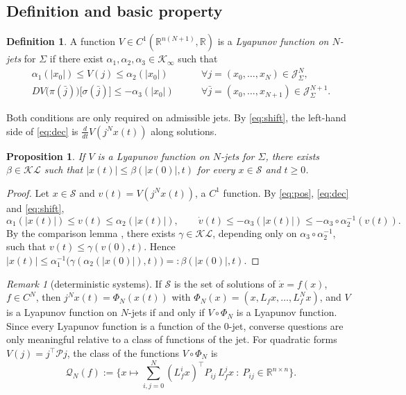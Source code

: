 \documentclass[preprint,12pt,authoryear]{elsarticle}
\newtheorem{proposition}[theorem]{Proposition}
\theoremstyle{definition}
\newtheorem{definition}[theorem]{Definition}
\theoremstyle{remark}
\newtheorem{remark}[theorem]{Remark}
\newcommand{\R}{\mathbb{R}}
\newcommand{\Jet}{\mathcal{J}}
\newcommand{\tr}{^{\top}}
\newcommand{\PP}{\mathcal{P}}
\newcommand{\Sol}{\mathcal{S}}
\begin{document}
\subsection{Definition and basic property}
\begin{definition}\label{def:jetLF}
A function $V\in C^1(\R^{n(N+1)},\R)$ is a \emph{Lyapunov function on $N$-jets} for $\Sigma$ if there exist $\alpha_1,\alpha_2,\alpha_3\in\mathcal K_\infty$ such that
\begin{align}
\alpha_1(|x_0|)\le V(j)\le\alpha_2(|x_0|)\qquad&\forall j=(x_0,\dots,x_N)\in\Jet^N_\Sigma,\label{eq:pos}\\
DV\big(\pi(\bar j)\big)\big[\sigma(\bar j)\big]\le-\alpha_3(|x_0|)\qquad&\forall \bar j=(x_0,\dots,x_{N+1})\in\Jet^{N+1}_\Sigma.\label{eq:dec}
\end{align}
\end{definition}
Both conditions are only required on admissible jets. By \eqref{eq:shift}, the left-hand side of \eqref{eq:dec} is $\frac{d}{dt}V(j^Nx(t))$ along solutions.

\begin{proposition}\label{prop:stab}
If $V$ is a Lyapunov function on $N$-jets for $\Sigma$, there exists $\beta\in\mathcal{KL}$ such that $|x(t)|\le\beta(|x(0)|,t)$ for every $x\in\Sol$ and $t\ge0$.
\end{proposition}
\begin{proof}
Let $x\in\Sol$ and $v(t)=V(j^Nx(t))$, a $C^1$ function. By \eqref{eq:pos}, \eqref{eq:dec} and \eqref{eq:shift},
\begin{equation}\label{eq:comp}
\alpha_1(|x(t)|)\le v(t)\le\alpha_2(|x(t)|),\qquad \dot v(t)\le-\alpha_3(|x(t)|)\le-\alpha_3\circ\alpha_2^{-1}(v(t)).
\end{equation}
By the comparison lemma \citep[Lemma 4.4]{Khalil2002}, there exists $\gamma\in\mathcal{KL}$, depending only on $\alpha_3\circ\alpha_2^{-1}$, such that $v(t)\le\gamma(v(0),t)$. Hence $|x(t)|\le\alpha_1^{-1}\big(\gamma(\alpha_2(|x(0)|),t)\big)=:\beta(|x(0)|,t)$.
\end{proof}

\begin{remark}[deterministic systems]\label{rem:det}
If $\Sol$ is the set of solutions of $\dot x=f(x)$, $f\in C^N$, then $j^Nx(t)=\Phi_N(x(t))$ with $\Phi_N(x)=(x,L_fx,\dots,L_f^Nx)$, and $V$ is a Lyapunov function on $N$-jets if and only if $V\circ\Phi_N$ is a Lyapunov function. Since every Lyapunov function is a function of the $0$-jet, converse questions are only meaningful relative to a class of functions of the jet. For quadratic forms $V(j)=j\tr\PP j$, the class of the functions $V\circ\Phi_N$ is
\begin{equation}\label{eq:QN}
\mathcal Q_N(f):=\Big\{x\mapsto\sum_{i,j=0}^N(L_f^ix)\tr P_{ij}\,L_f^jx\ :\ P_{ij}\in\R^{n\times n}\Big\}.
\end{equation}
\end{remark}
\end{document}
